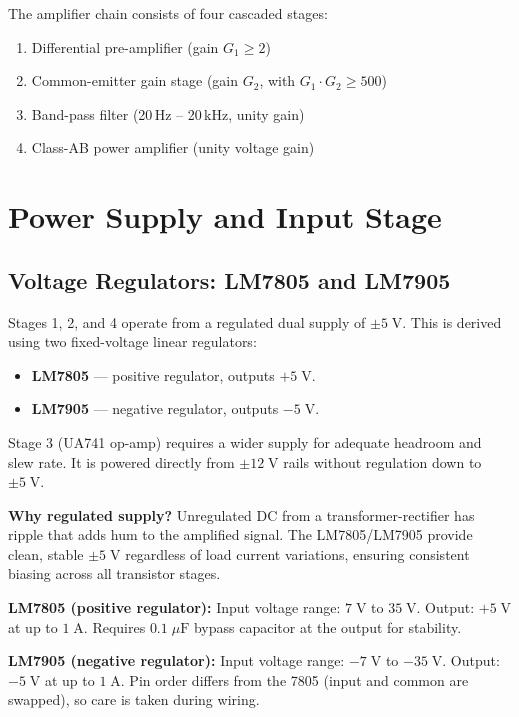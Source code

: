 \documentclass[10pt,twocolumn]{article}
\begin{document}
The amplifier chain consists of four cascaded stages:
\begin{enumerate}[nosep]
    \item Differential pre-amplifier (gain $G_1 \geq 2$)
    \item Common-emitter gain stage (gain $G_2$, with $G_1 \cdot G_2 \geq 500$)
    \item Band-pass filter (20\,Hz -- 20\,kHz, unity gain)
    \item Class-AB power amplifier (unity voltage gain)
\end{enumerate}

\section{Power Supply and Input Stage}

\subsection{Voltage Regulators: LM7805 and LM7905}
Stages 1, 2, and 4 operate from a regulated dual supply of $\pm5\;\text{V}$.
This is derived using two fixed-voltage linear regulators:

\begin{itemize}[nosep]
    \item \textbf{LM7805} — positive regulator, outputs $+5\;\text{V}$.
    \item \textbf{LM7905} — negative regulator, outputs $-5\;\text{V}$.
\end{itemize}

Stage 3 (UA741 op-amp) requires a wider supply for adequate headroom and slew rate.
It is powered directly from $\pm12\;\text{V}$ rails without regulation down to $\pm5\;\text{V}$.

\noindent\textbf{Why regulated supply?}
Unregulated DC from a transformer-rectifier has ripple that adds hum to the amplified signal.
The LM7805/LM7905 provide clean, stable $\pm5\;\text{V}$ regardless of load current variations,
ensuring consistent biasing across all transistor stages.

\noindent\textbf{LM7805 (positive regulator):}
Input voltage range: $7\;\text{V}$ to $35\;\text{V}$. Output: $+5\;\text{V}$ at up to $1\;\text{A}$.
Requires $0.1\;\mu\text{F}$ bypass capacitor at the output for stability.

\noindent\textbf{LM7905 (negative regulator):}
Input voltage range: $-7\;\text{V}$ to $-35\;\text{V}$. Output: $-5\;\text{V}$ at up to $1\;\text{A}$.
Pin order differs from the 7805 (input and common are swapped), so care is taken during wiring.
\end{document}

